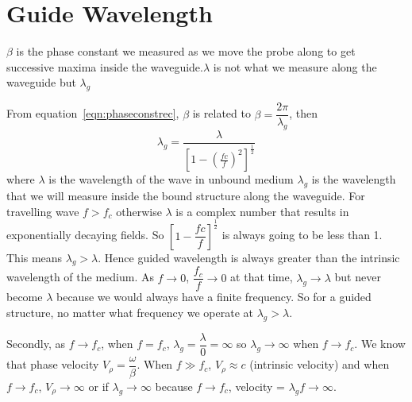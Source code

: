 \section{Guide Wavelength}
$\beta$ is the phase constant we measured as we move the probe along to get successive maxima inside the waveguide.$\lambda$ is not what we measure along the waveguide but $\lambda_g$

From equation~\ref{eqn:phaseconstrec}, $\beta$ is related to  $\beta = \dfrac{2\pi}{\lambda_g}$, then 
\begin{dmath}
\lambda_g = \frac{\lambda}{\left[1-{\left(\frac{fc}{f}\right)}^2\right]^{\frac{1}{2}}}
\label{eqn:lambdag}
\end{dmath}
where $\lambda$ is the wavelength of the wave in unbound medium $\lambda_g$ is the wavelength that we will measure inside the bound structure along the waveguide. For travelling wave $f>f_c$ otherwise $\lambda$ is a complex number that results in exponentially decaying fields. So $\left[1-{\dfrac{fc}{f}}\right]^{\frac{1}{2}}$ is always going to be less than 1. This means $\lambda_g>\lambda$. Hence guided wavelength is always greater than the intrinsic wavelength of the medium. As $f\longrightarrow0$, $\dfrac{f_c}{f}\longrightarrow0$ at that time, $\lambda_g\longrightarrow\lambda$ but never become $\lambda$ because we would always have a finite frequency. So for a guided structure, no matter what frequency we operate at $\lambda_g>\lambda$.

Secondly, as $f\longrightarrow f_c$, when $f=f_c$, $\lambda_g = \dfrac{\lambda}{0} = \infty$ so $\lambda_g\longrightarrow\infty$ when $f\longrightarrow f_c$. We know that phase velocity $V_\rho = \dfrac{\omega}{\beta}$. When $f\gg f_c$, $V_\rho\approx c$ (intrinsic velocity) and when $f\longrightarrow f_c$, $V_\rho\longrightarrow\infty$ or if $\lambda_g\longrightarrow\infty$ because $f\longrightarrow f_c$, velocity = $\lambda_gf\longrightarrow\infty$.

